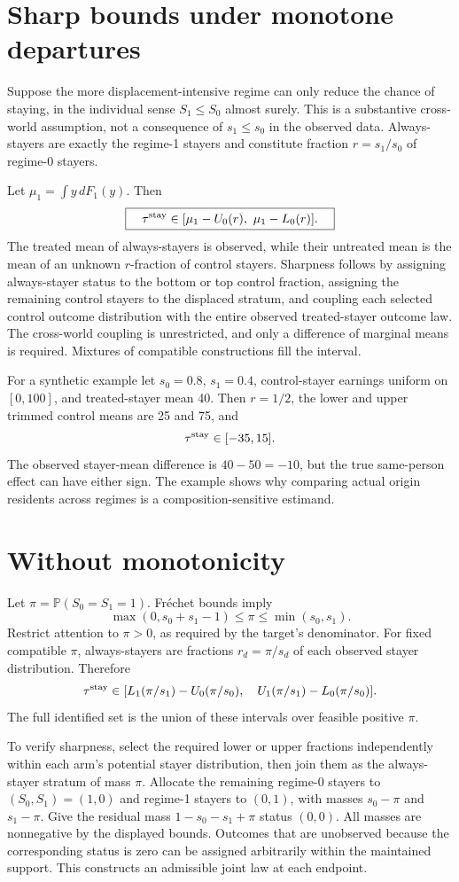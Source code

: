 \documentclass[11pt]{article}
\newcommand{\Prb}{\mathbb P}
\begin{document}
\section*{Sharp bounds under monotone departures}
Suppose the more displacement-intensive regime can only reduce the chance of staying, in the individual sense $S_1\leq S_0$ almost surely. This is a substantive cross-world assumption, not a consequence of $s_1\leq s_0$ in the observed data. Always-stayers are exactly the regime-1 stayers and constitute fraction $r=s_1/s_0$ of regime-0 stayers.

Let $\mu_1=\int y\,dF_1(y)$. Then
\[
 \boxed{\quad\tau^{\rm stay}\in
      [\mu_1-U_0(r),\ \mu_1-L_0(r)] .\quad}
\]
The treated mean of always-stayers is observed, while their untreated mean is the mean of an unknown $r$-fraction of control stayers. Sharpness follows by assigning always-stayer status to the bottom or top control fraction, assigning the remaining control stayers to the displaced stratum, and coupling each selected control outcome distribution with the entire observed treated-stayer outcome law. The cross-world coupling is unrestricted, and only a difference of marginal means is required. Mixtures of compatible constructions fill the interval.

For a synthetic example let $s_0=0.8$, $s_1=0.4$, control-stayer earnings uniform on $[0,100]$, and treated-stayer mean 40. Then $r=1/2$, the lower and upper trimmed control means are 25 and 75, and
\[
                         \tau^{\rm stay}\in[-35,15].
\]
The observed stayer-mean difference is $40-50=-10$, but the true same-person effect can have either sign. The example shows why comparing actual origin residents across regimes is a composition-sensitive estimand.

\section*{Without monotonicity}
Let $\pi=\Prb(S_0=S_1=1)$. Fr\'echet bounds imply
\[
 \max(0,s_0+s_1-1)\leq\pi\leq\min(s_0,s_1).
\]
Restrict attention to $\pi>0$, as required by the target's denominator. For fixed compatible $\pi$, always-stayers are fractions $r_d=\pi/s_d$ of each observed stayer distribution. Therefore
\[
 \tau^{\rm stay}\in
 [L_1(\pi/s_1)-U_0(\pi/s_0),\quad
  U_1(\pi/s_1)-L_0(\pi/s_0)].
\]
The full identified set is the union of these intervals over feasible positive $\pi$.

To verify sharpness, select the required lower or upper fractions independently within each arm's potential stayer distribution, then join them as the always-stayer stratum of mass $\pi$. Allocate the remaining regime-0 stayers to $(S_0,S_1)=(1,0)$ and regime-1 stayers to $(0,1)$, with masses $s_0-\pi$ and $s_1-\pi$. Give the residual mass $1-s_0-s_1+\pi$ status $(0,0)$. All masses are nonnegative by the displayed bounds. Outcomes that are unobserved because the corresponding status is zero can be assigned arbitrarily within the maintained support. This constructs an admissible joint law at each endpoint.
\end{document}
